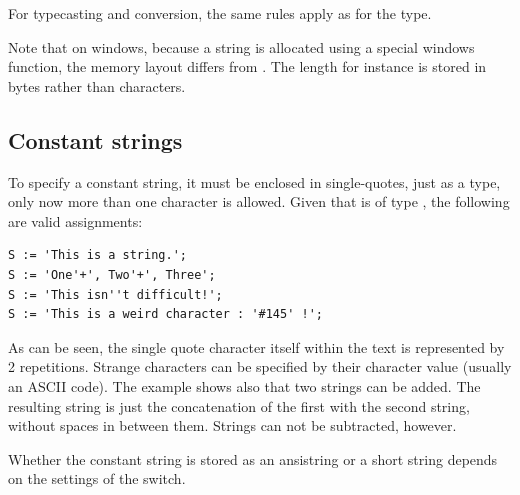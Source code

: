 For typecasting and conversion, the same rules apply as for the  type.

Note that on windows, because a  string is allocated using a special windows function, the
memory layout differs from . The length for instance is stored in bytes rather than characters.

\subsection{Constant strings}
To specify a constant string, it must be enclosed in single-quotes, just
as a  type, only now more than one character is allowed.
Given that  is of type , the following are valid assignments:
\begin{verbatim}
S := 'This is a string.';
S := 'One'+', Two'+', Three';
S := 'This isn''t difficult!';
S := 'This is a weird character : '#145' !';
\end{verbatim}
As can be seen, the single quote character itself within the text is represented
by 2 repetitions. Strange characters can be specified by their
character value (usually an ASCII code).
The example shows also that two strings can be added. The resulting string is
just the concatenation of the first with the second string, without spaces in
between them. Strings can not be subtracted, however.

Whether the constant string is stored as an ansistring or a short string
depends on the settings of the  switch.


